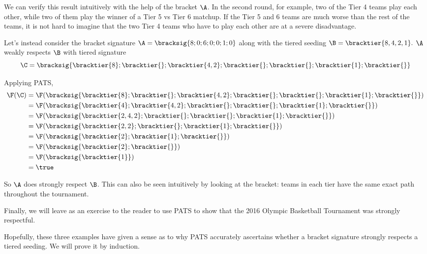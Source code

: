{    We can verify this result intuitively with the help of the bracket $\A$. In the second round, for example, two of the Tier 4 teams play each other, while two of them play the winner of a Tier 5 vs Tier 6 matchup. If the Tier 5 and 6 teams are much worse than the rest of the teams, it is not hard to imagine that the two Tier 4 teams who have to play each other are at a severe disadvantage.

    Let's instead consider the bracket signature $\A = \bracksig{8;0;6;0;0;1;0}$ along with the tiered seeding $\B = \bracktier{8,4,2,1}.$ $\A$ weakly respects $\B$ with tiered signature $$\C = \bracksig{\bracktier{8};\bracktier{};\bracktier{4,2};\bracktier{};\bracktier{};\bracktier{1};\bracktier{}}$$

    Applying PATS,
    \begin{align*}
        \F(\C) &= \F(\bracksig{\bracktier{8};\bracktier{};\bracktier{4,2};\bracktier{};\bracktier{};\bracktier{1};\bracktier{}})\\
        &= \F(\bracksig{\bracktier{4};\bracktier{4,2};\bracktier{};\bracktier{};\bracktier{1};\bracktier{}})\\
        &= \F(\bracksig{\bracktier{2,4,2};\bracktier{};\bracktier{};\bracktier{1};\bracktier{}})\\
        &= \F(\bracksig{\bracktier{2,2};\bracktier{};\bracktier{1};\bracktier{}})\\
        &= \F(\bracksig{\bracktier{2};\bracktier{1};\bracktier{}})\\
        &= \F(\bracksig{\bracktier{2};\bracktier{}})\\
        &= \F(\bracksig{\bracktier{1}})\\
        &= \true
    \end{align*}

    So $\A$ does strongly respect $\B$. This can also be seen intuitively by looking at the bracket: teams in each tier have the same exact path throughout the tournament.


    Finally, we will leave as an exercise to the reader to use PATS to show that the 2016 Olympic Basketball Tournament was strongly respectful.

    Hopefully, these three examples have given a sense as to why PATS accurately ascertains whether a bracket signature strongly respects a tiered seeding. We will prove it by induction.

}
